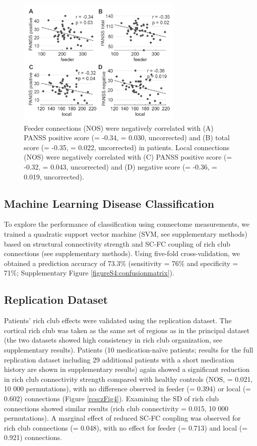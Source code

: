 \begin{refsection}
\begin{figure}[H]
\centering
  \includegraphics[width=8cm]{images/rcsczFig3.png}
  \caption{Feeder connections (NOS) were negatively correlated with (A) PANSS positive score (\rval = -0.34, \pval = 0.030, uncorrected) and (B) total score (\rval = -0.35, \pval = 0.022, uncorrected) in patients. Local connections (NOS) were negatively correlated with (C) PANSS positive score (\rval = -0.32, \pval = 0.043, uncorrected) and (D) negative score (\rval = -0.36, \pval = 0.019, uncorrected).}
  \label{rcsczFig3}
\end{figure}

\subsection*{Machine Learning Disease Classification}
To explore the performance of classification using connectome measurements, we trained a quadratic support vector machine (SVM, see supplementary methods) based on structural connectivity strength and SC-FC coupling of rich club connections (see supplementary methods). Using five-fold cross-validation, we obtained a prediction accuracy of 73.3\% (sensitivity = 76\% and specificity = 71\%; Supplementary Figure \ref{figureS4:confusionmatrix}).

\subsection*{Replication Dataset}
Patients' rich club effects were validated using the replication dataset. The cortical rich club was taken as the same set of regions as in the principal dataset (the two datasets showed high consistency in rich club organization, see supplementary results). Patients (10 medication-na\"{i}ve patients; results for the full replication dataset including 29 additional patients with a short medication history are shown in supplementary results) again showed a significant reduction in rich club connectivity strength compared with healthy controls (NOS, \pval = 0.021, 10 000 permutations), with no difference observed in feeder (\pval = 0.394) or local (\pval = 0.602) connections (Figure \ref{rcsczFig4}). Examining the SD of rich club connections showed similar results (rich club connectivity \pval = 0.015, 10 000 permutations). A marginal effect of reduced SC-FC coupling was observed for rich club connections (\pval = 0.048), with no effect for feeder (\pval = 0.713) and local (\pval = 0.921) connections.


\end{refsection}
